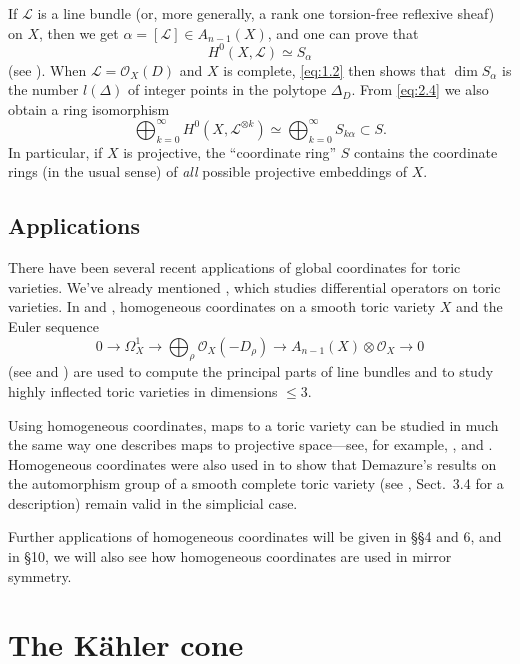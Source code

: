 \documentclass{amsart}
\theoremstyle{plain}
\theoremstyle{definition}
\begin{document}
	If $\mathcal{L}$ is a line bundle (or, more generally, a rank one
torsion-free reflexive sheaf) on $X$, then we get $\alpha = [\mathcal{L}]
\in A_{n-1}(X)$, and one can prove that
\begin{equation}
H^0(X,\mathcal{L}) \simeq S_\alpha
\tag{2.4}\label{eq:2.4}
\end{equation}
(see \cite{Cox2}).  When $\mathcal{L} = \mathcal{O}_X(D)$ and $X$ is complete,
\eqref{eq:1.2} then shows that $\dim S_\alpha$ is the number $l(\Delta)$
of integer points in the polytope $\Delta_D$.  From \eqref{eq:2.4} we
also obtain a ring isomorphism
\begin{equation}
\bigoplus_{k=0}^\infty H^0(X,\mathcal{L}^{\otimes k}) \simeq
\bigoplus_{k=0}^\infty S_{k\alpha} \subset S.
\tag{2.5}\label{eq:2.5}
\end{equation}
In particular, if $X$ is projective, the ``coordinate ring'' $S$
contains the coordinate rings (in the usual sense) of {\it all\/}
possible projective embeddings of $X$.

	\subsection{Applications} There have been several recent
applications of global coordinates for toric varieties.  We've already
mentioned \cite{Mus}, which studies differential operators on toric
varieties.  In \cite{Per1} and \cite{Per2}, homogeneous coordinates on
a smooth toric variety $X$ and the Euler sequence
\[
0 \longrightarrow \Omega^1_X \longrightarrow
{\textstyle{\bigoplus_\rho}} \mathcal{O}_X(-D_\rho) \longrightarrow
A_{n-1}(X)\otimes\mathcal{O}_X
\longrightarrow 0
\]
(see \cite{BC} and \cite{Jac}) are used to compute the principal parts
of line bundles and to study highly inflected toric varieties in
dimensions $\le 3$.

	Using homogeneous coordinates, maps to a toric variety can be
studied in much the same way one describes maps to projective
space---see, for example, \cite{Cox1}, \cite{Gue} and
\cite{Jac}.  Homogeneous coordinates were also used in \cite{Cox2} to
show that Demazure's results on the automorphism group of a smooth
complete toric variety (see \cite{Oda1}, Sect.~3.4 for a
description) remain valid in the simplicial case.

	Further applications of homogeneous coordinates will be given
in \S\S4 and 6, and in \S10, we will also see how homogeneous
coordinates are used in mirror symmetry.

\section{The K\"ahler cone}
\end{document}

